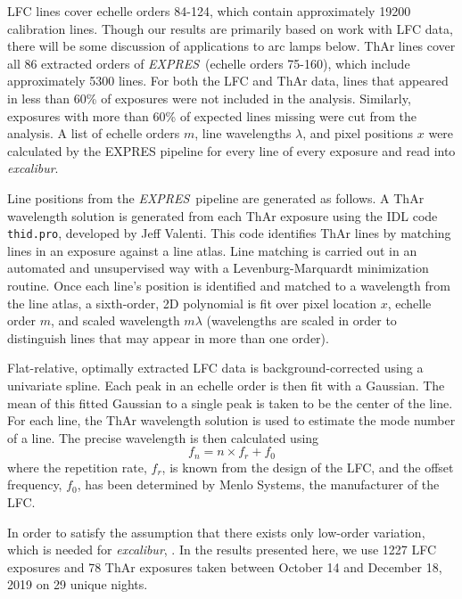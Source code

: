 \documentclass[twocolumn,table,xcolor,trackchanges]{aastex63}
\newcommand{\project}[1]{\textsl{#1}}
\newcommand{\name}{\project{excalibur}}
\newcommand{\acronym}[1]{{\small{#1}}}
\newcommand{\expres}{\project{\acronym{EXPRES}}}
\begin{document}
LFC lines cover echelle orders 84-124, which contain approximately 19200 calibration lines.  Though our results are primarily based on work with LFC data, there will be some discussion of applications to arc lamps below.   ThAr lines cover all 86 extracted orders of \expres\ (echelle orders 75-160), which include approximately 5300 lines.  For both the LFC and ThAr data, lines that appeared in less than 60\% of exposures were not included in the analysis.  Similarly, exposures with more than 60\% of expected lines missing were cut from the analysis.  A list of echelle orders $m$, line wavelengths $\lambda$, and pixel positions $x$ were calculated by the EXPRES pipeline \citep{petersburg2020} for every line of every exposure and read into \name.

Line positions from the \expres\ pipeline are generated as follows.  A ThAr wavelength solution is generated from each ThAr exposure using the IDL code \texttt{thid.pro}, developed by Jeff Valenti.  This code identifies ThAr lines by matching lines in an exposure against a line atlas.  Line matching is carried out in an automated and unsupervised way with a Levenburg-Marquardt minimization routine.  Once each line's position is identified and matched to a wavelength from the line atlas, a sixth-order, 2D polynomial is fit over pixel location $x$, echelle order $m$, and scaled wavelength $m\lambda$ (wavelengths are scaled in order to distinguish lines that may appear in more than one order).
 
 Flat-relative, optimally extracted LFC data is background-corrected using a univariate spline.  Each peak in an echelle order is then fit with a Gaussian.  The mean of this fitted Gaussian to a single peak is taken to be the center of the line.  For each line, the ThAr wavelength solution is used to estimate the mode number of a line.  The precise wavelength is then calculated using
 \begin{equation}
 f_n = n \times  f_r + f_0
 \label{eq:lfc}
 \end{equation}
 where the repetition rate, $f_r$, is known from the design of the LFC, and the offset frequency, $f_0$, has been determined by Menlo Systems, the manufacturer of the LFC.
 
In order to  satisfy the assumption that there exists only low-order variation, which is needed for \name, .  In the results presented here, we use 1227 LFC exposures and 78 ThAr exposures taken between October 14 and December 18, 2019 on 29 unique nights.
\end{document}
